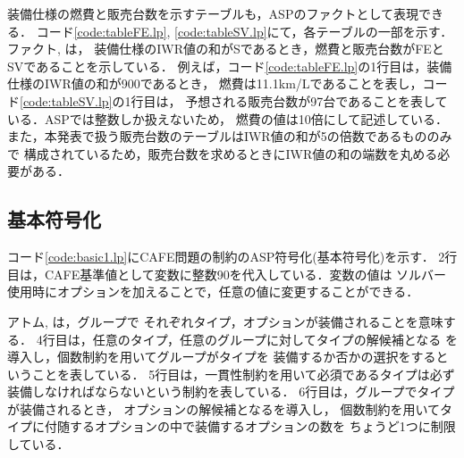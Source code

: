 装備仕様の燃費と販売台数を示すテーブルも，ASPのファクトとして表現できる．
コード\ref{code:tableFE.lp}, \ref{code:tableSV.lp}にて，各テーブルの一部を示す．
ファクト, は，
装備仕様のIWR値の和がSであるとき，燃費と販売台数がFEとSVであることを示している．
例えば，コード\ref{code:tableFE.lp}の1行目は，装備仕様のIWR値の和が900であるとき，
燃費は11.1km/Lであることを表し，コード\ref{code:tableSV.lp}の1行目は，
予想される販売台数が97台であることを表している．ASPでは整数しか扱えないため，
燃費の値は10倍にして記述している．
また，本発表で扱う販売台数のテーブルはIWR値の和が5の倍数であるもののみで
構成されているため，販売台数を求めるときにIWR値の和の端数を丸める必要がある．

 

 

\subsection{基本符号化}
 

コード\ref{code:basic1.lp}にCAFE問題の制約のASP符号化(基本符号化)を示す．
2行目は，CAFE基準値として変数に整数90を代入している．変数の値は
ソルバー使用時にオプションを加えることで，任意の値に変更することができる．

アトム, は，グループで
それぞれタイプ，オプションが装備されることを意味する．
%
4行目は，任意のタイプ，任意のグループに対してタイプの解候補となる
を導入し，個数制約を用いてグループがタイプを
装備するか否かの選択をするということを表している．
%
5行目は，一貫性制約を用いて必須であるタイプは必ず装備しなければならないという制約を表している．
%
6行目は，グループでタイプが装備されるとき，
オプションの解候補となるを導入し，
個数制約を用いてタイプに付随するオプションの中で装備するオプションの数を
ちょうど1つに制限している．



